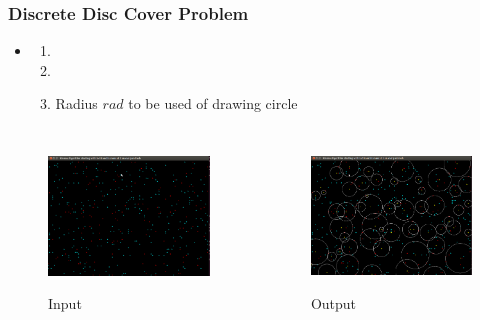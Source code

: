 \documentclass[blue]{beamer}
\begin{document}
\begin{frame}
 \frametitle{Discrete Disc Cover Problem}
   \begin{itemize}
   \item {}
     \begin{enumerate}
      \item {\color{red}{$n$ Red Points}}
      \item {\color{blue}{$m$ Blue Points}}
      \item Radius $rad$ to be used of drawing circle 
     \end{enumerate}
    \end{itemize}
    
    \begin{columns}
    {
    \begin{figure}[H]
     \caption{Input}
        \centering
           \scalebox{0.8}
          {\includegraphics[width=\linewidth]{cover2.png}}
     \end{figure}
    }
    {
    \begin{figure}[H]
     \caption{Output}
        \centering
           \scalebox{0.8}
          {\includegraphics[width=\linewidth]{cover3.png}}

\end{figure}}
\end{columns}
\end{frame}
\end{document}

